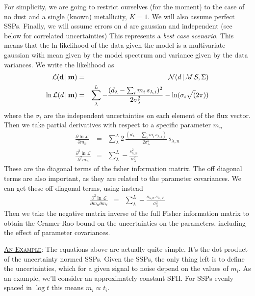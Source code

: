 \documentclass{article}
\begin{document}
For simplicity, we are going to restrict ourselves (for the moment) to the case of no dust and a single (known) metallicity, $K=1$.
We will also assume perfect SSPs.
Finally, we will assume errors on $d$ are gaussian and independent (see below for correlated uncertainties)
This represents a \emph{best case scenario}.
This means that the ln-likelihood of the data given the model is a multivariate
gaussian with mean given by the model spectrum and variance given by the data variances.
We write the likelihood as
\begin{eqnarray}
\mathcal{L}({\bf d} \,|\, {\bf m}) & = & \mathcal{N}(d \,|\, M \, S, \Sigma) \\
 \ln \mathcal{L}(d \,|\, {\bf m}) & = & \sum^L_\lambda -\frac{(d_\lambda - \sum_i m_i \, s_{\lambda, i})^2}
                                                      {2 \sigma_\lambda^2} - \ln(\sigma_i\sqrt(2\pi))
\end{eqnarray}
where the $\sigma_i$ are the independent uncertainties on each element of the flux vector.
Then we take partial derivatives with respect to a specific parameter $m_n$
\begin{eqnarray}
\frac{\partial \ln \mathcal{L}}{\partial m_n} & = & \sum^L_\lambda  2 \, \frac{(d_\lambda - \sum_i m_i \, s_{\lambda, i})}{2 \sigma_\lambda^2} \, s_{\lambda, n} \\
\frac{\partial^2 \ln \mathcal{L}}{\partial^2 m_n} & = & \sum^L_\lambda -\frac{s_{\lambda, n}^2}{\sigma_\lambda^2} 
\end{eqnarray}
These are the diagonal terms of the fisher information matrix.  The off diagonal terms are also important, as they are related to the parameter covariances. We can get these off diagonal terms, using instead
\begin{eqnarray}
\frac{\partial^2 \ln \mathcal{L}}{\partial m_n \partial m_\ell} & = & \sum^L_\lambda -\frac{s_{\lambda, n}\, s_{\lambda, \ell}}{\sigma_\lambda^2} 
\end{eqnarray}
Then we take the negative matrix inverse of the full Fisher information matrix to obtain the Cramer-Rao bound on the uncertainties on the parameters, including the effect of parameter covariances.


\underline{\textsc{An Example}}:  
The equations above are actually quite simple.  
It's the dot product of the uncertainty normed SSPs. 
Given the SSPs, the only thing left is to define the uncertainties, which for a given signal to noise depend on the values of $m_i$.  
As an example, we'll consider an approximately constant SFH.  For SSPs evenly spaced in $\log t$ this means $m_i \propto t_i$.
\end{document}
